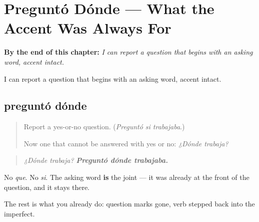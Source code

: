 
\chapter{Preguntó Dónde --- What the Accent Was Always For}
\label{ch:pregunto-donde}

\begin{chapteropening}
\textbf{By the end of this chapter:} \emph{I can report a question that begins with an asking word, accent intact.}

I can report a question that begins with an asking word, accent intact.
\end{chapteropening}

\section[preguntó dónde]{preguntó dónde}

\label{lesson:ES-C57-pregunto-donde}



\begin{quote}
Report a yes-or-no question. (\emph{Preguntó si trabajaba}.)

Now one that cannot be answered with yes or no: \emph{¿Dónde trabaja?}
\end{quote}

\begin{grammarlens}[title={Grammar Lens: the asking word is the joint}]
\begin{quote}
\emph{¿Dónde trabaja?} \emph{\textbf{Preguntó dónde trabajaba.}}
\end{quote}

No \emph{que}. No \emph{si}. The asking word \textbf{is} the joint — it was already at the front of the question, and it stays there.

The rest is what you already do: question marks gone, verb stepped back into the imperfect.
\end{grammarlens}

